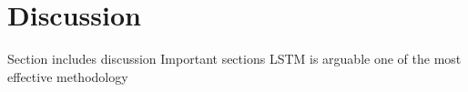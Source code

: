 \section{Discussion}
Section includes discussion
Important sections
LSTM is arguable one of the most effective methodology 